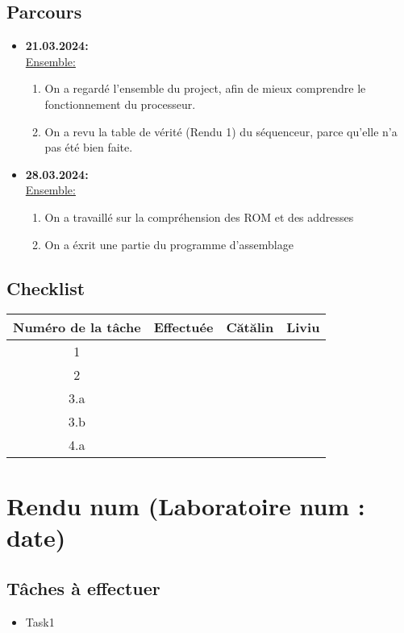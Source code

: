 \documentclass{article}
\begin{document}
    \subsection{Parcours}
    \begin{itemize}
        \item \textbf{21.03.2024:} \\
        \underline{Ensemble:}
        \begin{enumerate}
            \item On a regardé l'ensemble du project, afin de mieux comprendre le fonctionnement du processeur.
            \item On a revu la table de vérité (Rendu 1) du séquenceur, parce qu'elle n'a pas été bien faite.
        \end{enumerate}
        \item \textbf{28.03.2024:} \\
        \underline{Ensemble:}
        \begin{enumerate}
            \item On a travaillé sur la compréhension des ROM et des addresses
            \item On a éxrit une partie du programme d'assemblage
        \end{enumerate}
    \end{itemize}
    \subsection{Checklist}
    \begin{center}
        \begin{tabular}{|c|c|c|c|}
            \hline
            Numéro de la tâche & Effectuée & Cătălin & Liviu \\
            \hline
            \hline 1 &   &   &   \\ 
            \hline 2 &   &   &   \\
            \hline 3.a &   &   &   \\
            \hline 3.b &   &   &   \\
            \hline 4.a &   &   &   \\
            \hline
        \end{tabular}
    \end{center}
    \newpage

    \section{Rendu num (Laboratoire num : date) }
    \subsection{Tâches à effectuer}
    \begin{itemize}
        \item Task1
    \end{itemize}
    \newpage
\end{document}
